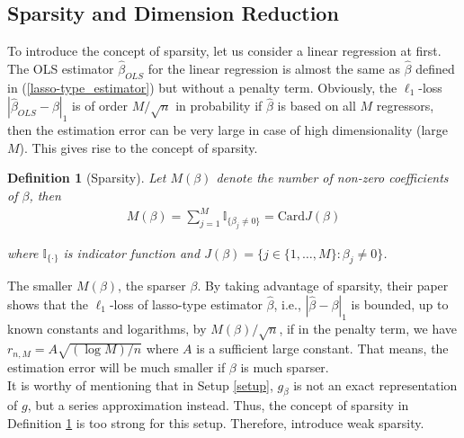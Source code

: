 \documentclass[12pt, a4paper]{article}
\theoremstyle{MAstyle} \newtheorem{assumption}{Assumption}[section]
\theoremstyle{MAstyle} \newtheorem{definition}{Definition}[section]
\theoremstyle{MAstyle} \newtheorem{theorem}{Theorem}[section]
\theoremstyle{MAstyle} \newtheorem{corollary}{Corollary}[section]
\begin{document}
            \subsection{Sparsity and Dimension Reduction}\label{sparsity_and_dimension_reduction}
                To introduce the concept of sparsity, let us consider a linear regression at first. The OLS estimator $\widehat{\beta}_{OLS}$ for the linear regression is almost the same as $\widehat{\beta}$ defined in (\ref{lasso-type_estimator}) but without a penalty term. Obviously, the $\ell_1$-loss $|\widehat{\beta}_{OLS}-\beta|_1$ is of order $M/\sqrt{n}$ in probability if $\widehat{\beta}$ is based on all $M$ regressors, then the estimation error can be very large in case of high dimensionality (large $M$). This gives rise to the concept of sparsity.

                \begin{definition}[Sparsity]\label{sparsity}
                    Let $M(\beta)$ denote the number of non-zero coefficients of $\beta$, then
                    \begin{align}
                        M(\beta)=\sum\limits_{j=1}^M \mathds{I}_{\{\beta_j \not= 0\}}=\mathrm{Card} J(\beta)
                    \end{align}

                    where $\mathds{I}_{\{\cdot\}}$ is indicator function and $J(\beta)=\{j \in \{1, \ldots, M\}: \beta_j \not=0\}$. 
                \end{definition}

                The smaller $M(\beta)$, the sparser $\beta$. By taking advantage of sparsity, their paper shows that the $\ell_1$-loss of lasso-type estimator $\widehat{\beta}$, i.e., $|\widehat{\beta}-\beta|_1$ is bounded, up to known constants and logarithms, by $M(\beta)/\sqrt{n}$, if in the penalty term, we have $r_{n,M}=A\sqrt{(\log M)/n}$ where $A$ is a sufficient large constant. That means, the estimation error will be much smaller if $\beta$ is much sparser.\\

                It is worthy of mentioning that in Setup \ref{setup}, $g_{\beta}$ is not an exact representation of $g$, but a series approximation instead. Thus, the concept of sparsity in Definition \ref{sparsity} is too strong for this setup. Therefore, \cite{Bunea_2007} introduce weak sparsity.
\end{document}
